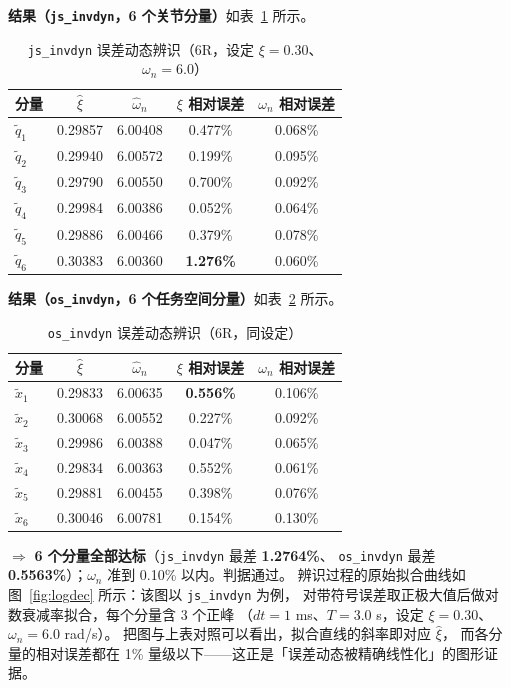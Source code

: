 \documentclass[11pt,a4paper]{ctexart}
\begin{document}
\textbf{结果（\texttt{js\_invdyn}，6 个关节分量）}如表~\ref{tab:jsfit} 所示。

\begin{table}[H]
\centering
\small
\caption{\texttt{js\_invdyn} 误差动态辨识（6R，设定 $\xi=0.30$、$\omega_n=6.0$）}\label{tab:jsfit}
\begin{tabular}{@{}lcccc@{}}
\toprule
分量 & $\hat\xi$ & $\hat\omega_n$ & $\xi$ 相对误差 & $\omega_n$ 相对误差 \\
\midrule
$\tilde q_1$ & 0.29857 & 6.00408 & 0.477\% & 0.068\% \\
$\tilde q_2$ & 0.29940 & 6.00572 & 0.199\% & 0.095\% \\
$\tilde q_3$ & 0.29790 & 6.00550 & 0.700\% & 0.092\% \\
$\tilde q_4$ & 0.29984 & 6.00386 & 0.052\% & 0.064\% \\
$\tilde q_5$ & 0.29886 & 6.00466 & 0.379\% & 0.078\% \\
\textbf{$\tilde q_6$} & 0.30383 & 6.00360 & \textbf{1.276\%} & 0.060\% \\
\bottomrule
\end{tabular}
\end{table}

\textbf{结果（\texttt{os\_invdyn}，6 个任务空间分量）}如表~\ref{tab:osfit} 所示。

\begin{table}[H]
\centering
\small
\caption{\texttt{os\_invdyn} 误差动态辨识（6R，同设定）}\label{tab:osfit}
\begin{tabular}{@{}lcccc@{}}
\toprule
分量 & $\hat\xi$ & $\hat\omega_n$ & $\xi$ 相对误差 & $\omega_n$ 相对误差 \\
\midrule
$\tilde x_1$ & 0.29833 & 6.00635 & \textbf{0.556\%} & 0.106\% \\
$\tilde x_2$ & 0.30068 & 6.00552 & 0.227\% & 0.092\% \\
$\tilde x_3$ & 0.29986 & 6.00388 & 0.047\% & 0.065\% \\
$\tilde x_4$ & 0.29834 & 6.00363 & 0.552\% & 0.061\% \\
$\tilde x_5$ & 0.29881 & 6.00455 & 0.398\% & 0.076\% \\
$\tilde x_6$ & 0.30046 & 6.00781 & 0.154\% & 0.130\% \\
\bottomrule
\end{tabular}
\end{table}

$\Rightarrow$ \textbf{6 个分量全部达标}（\texttt{js\_invdyn} 最差 \textbf{1.2764\%}、
\texttt{os\_invdyn} 最差 \textbf{0.5563\%}）；$\omega_n$ 准到 0.10\% 以内。判据通过。
辨识过程的原始拟合曲线如图~\ref{fig:logdec} 所示：该图以 \texttt{js\_invdyn} 为例，
对带符号误差取正极大值后做对数衰减率拟合，每个分量含 3 个正峰
（$dt=1$ ms、$T=3.0$ s，设定 $\xi=0.30$、$\omega_n=6.0$ rad/s）。
把图与上表对照可以看出，拟合直线的斜率即对应 $\hat\xi$，
而各分量的相对误差都在 1\% 量级以下——这正是「误差动态被精确线性化」的图形证据。
\end{document}
